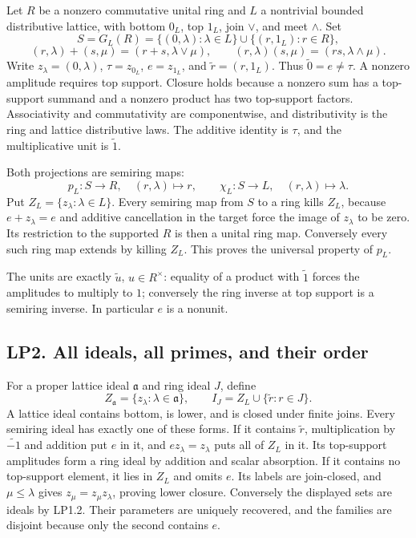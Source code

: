 Let \(R\) be a nonzero commutative unital ring and \(L\) a nontrivial
bounded distributive lattice, with bottom \(0_L\), top \(1_L\), join
\(\vee\), and meet \(\wedge\). Set \[
S=G_L(R)=\{(0,\lambda):\lambda\in L\}\cup\{(r,1_L):r\in R\},
\tag{LP1.1}
\] \[
(r,\lambda)+(s,\mu)=(r+s,\lambda\vee\mu),\qquad
(r,\lambda)(s,\mu)=(rs,\lambda\wedge\mu).
\tag{LP1.2}
\] Write \(z_\lambda=(0,\lambda)\), \(\tau=z_{0_L}\), \(e=z_{1_L}\), and
\(\widetilde r=(r,1_L)\). Thus \(\widetilde0=e\ne\tau\). A nonzero
amplitude requires top support. Closure holds because a nonzero sum has
a top-support summand and a nonzero product has two top-support factors.
Associativity and commutativity are componentwise, and distributivity is
the ring and lattice distributive laws. The additive identity is
\(\tau\), and the multiplicative unit is \(\widetilde1\).

Both projections are semiring maps: \[
p_L:S\to R,\quad(r,\lambda)\mapsto r,\qquad
\chi_L:S\to L,\quad(r,\lambda)\mapsto\lambda.
\tag{LP1.3}
\] Put \(Z_L=\{z_\lambda:\lambda\in L\}\). Every semiring map from \(S\)
to a ring kills \(Z_L\), because \(e+z_\lambda=e\) and additive
cancellation in the target force the image of \(z_\lambda\) to be zero.
Its restriction to the supported \(R\) is then a unital ring map.
Conversely every such ring map extends by killing \(Z_L\). This proves
the universal property of \(p_L\).

The units are exactly \(\widetilde u\), \(u\in R^\times\): equality of a
product with \(\widetilde1\) forces the amplitudes to multiply to \(1\);
conversely the ring inverse at top support is a semiring inverse. In
particular \(e\) is a nonunit.

\subsection{LP2. All ideals, all primes, and their
order}\label{lp2.-all-ideals-all-primes-and-their-order}

For a proper lattice ideal \(\mathfrak a\) and ring ideal \(J\), define
\[
Z_{\mathfrak a}=\{z_\lambda:\lambda\in\mathfrak a\},\qquad
I_J=Z_L\cup\{\widetilde r:r\in J\}.
\tag{LP2.1}
\] A lattice ideal contains bottom, is lower, and is closed under finite
joins. Every semiring ideal has exactly one of these forms. If it
contains \(\widetilde r\), multiplication by \(\widetilde{-1}\) and
addition put \(e\) in it, and \(ez_\lambda=z_\lambda\) puts all of
\(Z_L\) in it. Its top-support amplitudes form a ring ideal by addition
and scalar absorption. If it contains no top-support element, it lies in
\(Z_L\) and omits \(e\). Its labels are join-closed, and
\(\mu\le\lambda\) gives \(z_\mu=z_\mu z_\lambda\), proving lower
closure. Conversely the displayed sets are ideals by LP1.2. Their
parameters are uniquely recovered, and the families are disjoint because
only the second contains \(e\).


